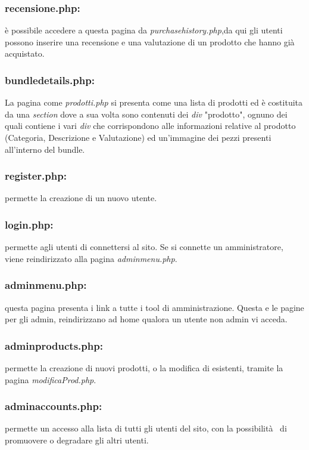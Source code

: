 \subsubsection{recensione.php:} \Spazio è possibile accedere a questa pagina da \textit{purchasehistory.php},da qui gli utenti possono inserire una recensione e una valutazione di un prodotto che hanno già  acquistato.

\subsubsection{bundledetails.php:} \Spazio 
La pagina come \emph{prodotti.php} si presenta come una lista di prodotti ed è costituita da una \emph{section} dove a sua volta sono contenuti dei \emph{div} "prodotto", ognuno dei quali contiene i vari \emph{div} che corrispondono alle informazioni relative al prodotto (Categoria, Descrizione e Valutazione) ed un'immagine dei pezzi presenti all'interno del bundle.

\subsubsection{register.php:} \Spazio permette la creazione di un nuovo utente.

\subsubsection{login.php:} \Spazio permette agli utenti di connettersi al sito. Se si connette un amministratore, viene reindirizzato alla pagina \textit{adminmenu.php}.

\subsubsection{adminmenu.php:} \Spazio questa pagina presenta i link a tutte i tool di amministrazione. Questa e le pagine per gli admin, reindirizzano ad home qualora un utente non admin vi acceda.

\subsubsection{adminproducts.php:} \Spazio permette la creazione di nuovi prodotti, o la modifica di esistenti, tramite la pagina \textit{modificaProd.php}.

\subsubsection{adminaccounts.php:} \Spazio permette un accesso alla lista di tutti gli utenti del sito, con la possibilità  di promuovere o degradare gli altri utenti.

